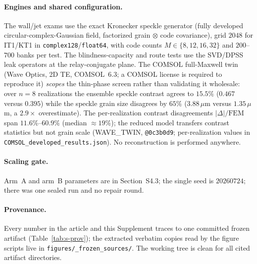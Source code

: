 \documentclass[10pt,onecolumn]{article}
\theoremstyle{plain}
\theoremstyle{definition}
\begin{document}
\paragraph{Engines and shared configuration.}
The wall/jet exams use the exact Kronecker speckle generator (fully developed
circular-complex-Gaussian field, factorized grain $\otimes$ code covariance),
grid $2048$ for IT1/KT1 in \texttt{complex128}\slash\texttt{float64}, with code counts
$M\in\{8,12,16,32\}$ and $200$--$700$ banks per test. The blindness-capacity and
route tests use the SVD/DPSS leak operators at the relay-conjugate plane. The
COMSOL full-Maxwell twin (Wave Optics, 2D TE, COMSOL~6.3; a COMSOL license is
required to reproduce it) \emph{scopes} the thin-phase screen rather than validating
it wholesale: over $n=8$ realizations the ensemble speckle contrast agrees to
$15.5\%$ ($0.467$ versus $0.395$) while the speckle grain size disagrees by $65\%$
($3.88\,\mu$m versus $1.35\,\mu$m, a $2.9\times$ overestimate). The per-realization
contrast disagreements $\lvert\Delta\rvert/\mathrm{FEM}$ span $11.6\%$--$60.9\%$
(median $\approx19\%$); the reduced model transfers contrast statistics but not grain
scale (WAVE\_TWIN, \texttt{@0c3b0d9}; per-realization values in
\texttt{COMSOL\_developed\_results.json}). No reconstruction is performed anywhere.

\paragraph{Scaling gate.}
Arm~A and arm~B parameters are in Section~S4.3; the single seed is $20260724$; there
was one sealed run and no repair round.

\paragraph{Provenance.} Every number in the article and this Supplement traces to one
committed frozen artifact (Table~\ref{tab:s-prov}); the extracted verbatim copies
read by the figure scripts live in \texttt{figures/\_frozen\_sources/}. The working
tree is clean for all cited artifact directories.
\end{document}
